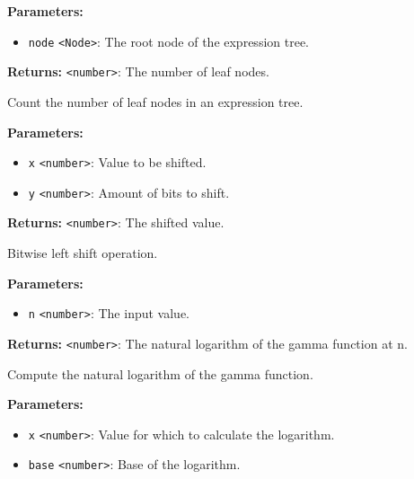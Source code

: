\documentclass[12pt,a4paper]{article}
\begin{document}
\noindent \textbf{Parameters:}
\begin{itemize}
  \item \texttt{node} \texttt{<Node>}: The root node of the expression tree.
\end{itemize}

\noindent \textbf{Returns:} \texttt{<number>}: The number of leaf nodes.

\noindent Count the number of leaf nodes in an expression tree.

\vspace{5mm}
\noindent {}


\noindent \textbf{Parameters:}
\begin{itemize}
  \item \texttt{x} \texttt{<number>}: Value to be shifted.
  \item \texttt{y} \texttt{<number>}: Amount of bits to shift.
\end{itemize}

\noindent \textbf{Returns:} \texttt{<number>}: The shifted value.

\noindent Bitwise left shift operation.

\vspace{5mm}
\noindent {}


\noindent \textbf{Parameters:}
\begin{itemize}
  \item \texttt{n} \texttt{<number>}: The input value.
\end{itemize}

\noindent \textbf{Returns:} \texttt{<number>}: The natural logarithm of the gamma function at n.

\noindent Compute the natural logarithm of the gamma function.

\vspace{5mm}
\noindent {}


\noindent \textbf{Parameters:}
\begin{itemize}
  \item \texttt{x} \texttt{<number>}: Value for which to calculate the logarithm.
  \item \texttt{base} \texttt{<number>}: Base of the logarithm.
\end{itemize}
\end{document}
